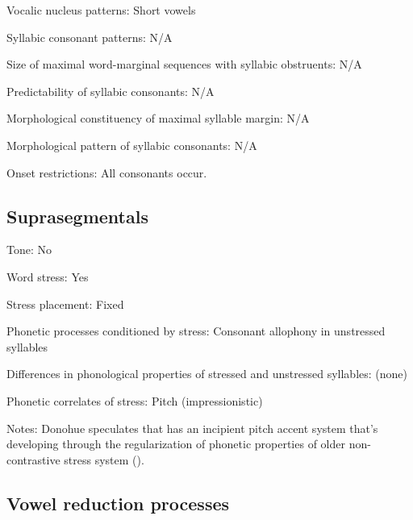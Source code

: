 {\begin{appendixdesc}
\item[Vocalic nucleus patterns:] Short vowels

\item[Syllabic consonant patterns:] N/A

\item[Size of maximal word-marginal sequences with syllabic obstruents:] N/A

\item[Predictability of syllabic consonants:] N/A

\item[Morphological constituency of maximal syllable margin:] N/A

\item[Morphological pattern of syllabic consonants:] N/A

\item[Onset restrictions:] All consonants occur.
\end{appendixdesc}
\subsection*{Suprasegmentals}
\begin{appendixdesc}
\item[Tone:] No

\item[Word stress:] Yes

\item[Stress placement:] Fixed

\item[Phonetic processes conditioned by stress:] Consonant allophony in unstressed syllables

\item[Differences in phonological properties of stressed and unstressed syllables:] (none)

\item[Phonetic correlates of stress:] Pitch (impressionistic)

\item[Notes:] Donohue speculates that  has an incipient pitch accent system that’s developing through the regularization of phonetic properties of older non-contrastive stress system (\citeyear[34]{Donohue1999}).
\end{appendixdesc}
\subsection*{Vowel reduction processes}
\begin{appendixdesc}


\end{appendixdesc}}
